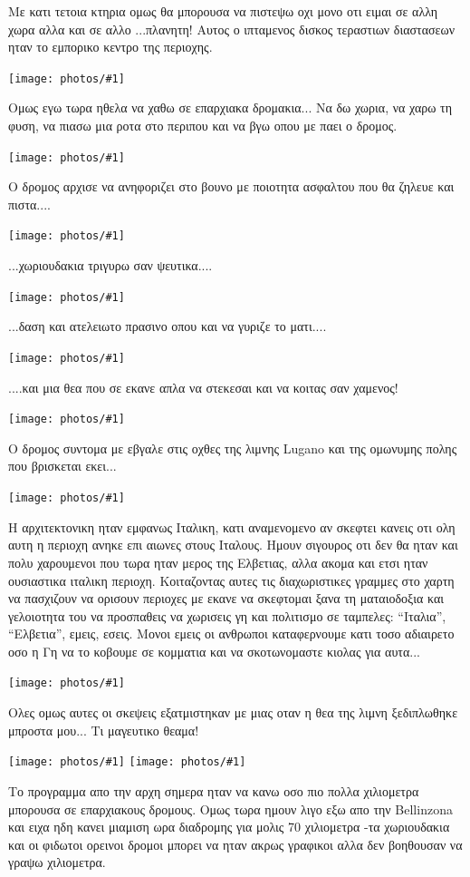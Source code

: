 \documentclass[11pt, letterpaper]{book}
\newcommand\photo[1]{\noindent\texttt{[image: photos/\#1]}}
\begin{document}
Με κατι τετοια κτηρια ομως θα μπορουσα να πιστεψω οχι μονο οτι ειμαι σε αλλη χωρα αλλα και σε αλλο ...πλανητη! Αυτος ο ιπταμενος δισκος τεραστιων διαστασεων ηταν το εμπορικο κεντρο της περιοχης.

\photo{25.jpg}

Ομως εγω τωρα ηθελα να χαθω σε επαρχιακα δρομακια... 
Να δω χωρια, να χαρω τη φυση, να πιασω μια ροτα στο περιπου και να βγω οπου με παει ο δρομος.

\photo{26.jpg}

Ο δρομος αρχισε να ανηφοριζει στο βουνο με ποιοτητα ασφαλτου που θα ζηλευε και πιστα....

\photo{27.jpg}

...χωριουδακια τριγυρω σαν ψευτικα....

\photo{28.jpg}

...δαση και ατελειωτο πρασινο οπου και να γυριζε το ματι....

\photo{29.jpg}

....και μια θεα που σε εκανε απλα να στεκεσαι και να κοιτας σαν χαμενος!

\photo{30.jpg}

Ο δρομος συντομα με εβγαλε στις οχθες της λιμνης Lugano και της ομωνυμης πολης που βρισκεται εκει...

\photo{31.jpg}

Η αρχιτεκτονικη ηταν εμφανως Ιταλικη, κατι αναμενομενο αν σκεφτει κανεις οτι ολη αυτη η περιοχη ανηκε επι αιωνες στους Ιταλους. Ημουν σιγουρος οτι δεν θα ηταν και πολυ χαρουμενοι που τωρα ηταν μερος της Ελβετιας, αλλα ακομα και ετσι ηταν ουσιαστικα ιταλικη περιοχη. 
Κοιταζοντας αυτες τις διαχωριστικες γραμμες στο χαρτη να πασχιζουν να ορισουν περιοχες με εκανε να σκεφτομαι ξανα τη ματαιοδοξια και γελοιοτητα του να προσπαθεις να χωρισεις γη και πολιτισμο σε ταμπελες: ``Ιταλια'', ``Ελβετια'', εμεις, εσεις. Μονοι εμεις οι ανθρωποι καταφερνουμε κατι τοσο αδιαιρετο οσο η Γη να το κοβουμε σε κομματια και να σκοτωνομαστε κιολας για αυτα...

\photo{32.jpg}

Ολες ομως αυτες οι σκεψεις εξατμιστηκαν με μιας οταν η θεα της λιμνη ξεδιπλωθηκε μπροστα μου... 
Τι μαγευτικο θεαμα!

\photo{33.jpg}
\photo{34.jpg}

Το προγραμμα απο την αρχη σημερα ηταν να κανω οσο πιο πολλα χιλιομετρα μπορουσα σε επαρχιακους δρομους. 
Ομως τωρα ημουν λιγο εξω απο την Bellinzona και ειχα ηδη κανει μιαμιση ωρα διαδρομης για μολις 70 χιλιομετρα -τα χωριουδακια και οι φιδωτοι ορεινοι δρομοι μπορει να ηταν ακρως γραφικοι αλλα δεν βοηθουσαν να γραψω χιλιομετρα.
\end{document}
